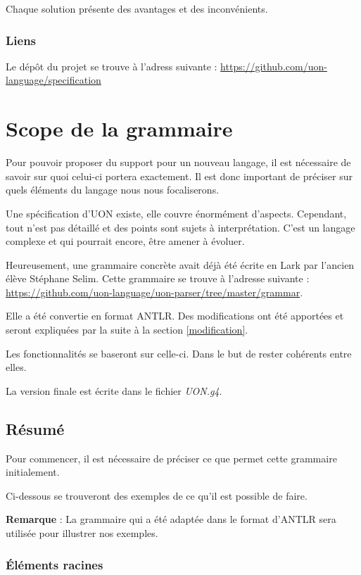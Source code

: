 \documentclass[
    iict, %
    il, %
]{heig-tb}
\begin{document}
Chaque solution présente des avantages et des inconvénients.

\subsection{Liens}
Le dépôt du projet se trouve à l'adress suivante : \url{https://github.com/uon-language/specification}

\chapter{Scope de la grammaire}\label{grammar scope}
Pour pouvoir proposer du support pour un nouveau langage, il est nécessaire de savoir sur quoi celui-ci portera exactement.
Il est donc important de préciser sur quels éléments du langage nous nous focaliserons.

Une spécification d'UON existe, elle couvre énormément d'aspects. Cependant, tout n'est pas détaillé et des points sont sujets à interprétation.
C'est un langage complexe et qui pourrait encore, être amener à évoluer.

Heureusement, une grammaire concrète avait déjà été écrite en Lark par l'ancien élève Stéphane Selim.
Cette grammaire se trouve à l'adresse suivante : \url{https://github.com/uon-language/uon-parser/tree/master/grammar}.

Elle a été convertie en format ANTLR. Des modifications ont été apportées et seront expliquées par la suite à la section \ref{modification}.

Les fonctionnalités se baseront sur celle-ci. Dans le but de rester cohérents entre elles.

La version finale est écrite dans le fichier \emph{UON.g4}.

\section{Résumé}
Pour commencer, il est nécessaire de préciser ce que permet cette grammaire initialement.

Ci-dessous se trouveront des exemples de ce qu'il est possible de faire.

\textbf{Remarque} : La grammaire qui a été adaptée dans le format d'ANTLR sera utilisée pour illustrer nos exemples.

\subsection{Éléments racines}
\end{document}
